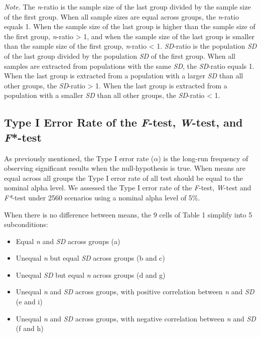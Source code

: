 \documentclass[man,floatsintext]{apa6}
\providecommand{\tightlist}{%
  \setlength{\itemsep}{0pt}\setlength{\parskip}{0pt}}
\begin{document}
\emph{Note.} The \emph{n}-ratio is the sample size of the last group divided by the sample size of the first group. When all sample sizes are equal across groups, the \emph{n}-ratio equals 1. When the sample size of the last group is higher than the sample size of the first group, \emph{n}-ratio \textgreater{} 1, and when the sample size of the last group is smaller than the sample size of the first group, \emph{n}-ratio \textless{} 1. \emph{SD}-ratio is the population \emph{SD} of the last group divided by the population \emph{SD} of the first group. When all samples are extracted from populations with the same \emph{SD}, the \emph{SD}-ratio equals 1. When the last group is extracted from a population with a larger \emph{SD} than all other groups, the \emph{SD}-ratio \textgreater{} 1. When the last group is extracted from a population with a smaller \emph{SD} than all other groups, the \emph{SD}-ratio \textless{} 1.

\hypertarget{type-i-error-rate-of-the-f-test-w-test-and-f-test}{%
\subsection{\texorpdfstring{Type I Error Rate of the \emph{F}-test, \emph{W}-test, and \emph{F}*-test}{Type I Error Rate of the F-test, W-test, and F*-test}}\label{type-i-error-rate-of-the-f-test-w-test-and-f-test}}

As previously mentioned, the Type I error rate (\(\alpha\)) is the long-run frequency of observing significant results when the null-hypothesis is true. When means are equal across all groups the Type I error rate of all test should be equal to the nominal alpha level. We assessed the Type I error rate of the \emph{F}-test, \emph{W}-test and \emph{F*}-test under 2560 scenarios using a nominal alpha level of 5\%.

When there is no difference between means, the 9 cells of Table 1 simplify into 5 subconditions:

\begin{itemize}
\tightlist
\item
  Equal \emph{n} and \emph{SD} across groups (a)\\
\item
  Unequal \emph{n} but equal \emph{SD} across groups (b and c)\\
\item
  Unequal \emph{SD} but equal \emph{n} across groups (d and g)\\
\item
  Unequal \emph{n} and \emph{SD} across groups, with positive correlation between \emph{n} and \emph{SD} (e and i)\\
\item
  Unequal \emph{n} and \emph{SD} across groups, with negative correlation between \emph{n} and \emph{SD} (f and h)
\end{itemize}
\end{document}
